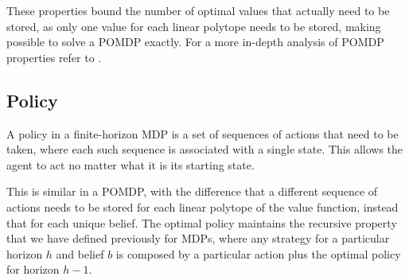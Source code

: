 These properties bound the number of optimal values that actually need to be stored, as only one
value for each linear polytope needs to be stored, making possible to solve a POMDP exactly. For a
more in-depth analysis of POMDP properties refer to \cite{cit:pomdp}.

\subsection{Policy}

A policy in a finite-horizon MDP is a set of sequences of actions that need to be taken, where each
such sequence is associated with a single state. This allows the agent to act no matter what it is
its starting state.

This is similar in a POMDP, with the difference that a different sequence of actions needs to be
stored for each linear polytope of the value function, instead that for each unique belief. The
optimal policy maintains the recursive property that we have defined previously for MDPs, where any
strategy for a particular horizon $h$ and belief $b$ is composed by a particular action plus the
optimal policy for horizon $h-1$.

%
%
%
%

